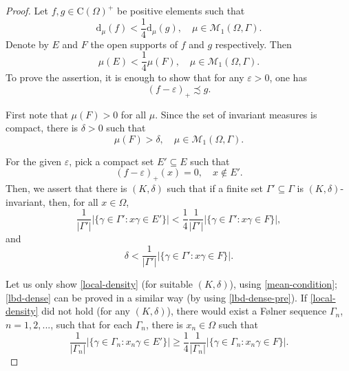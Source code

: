 \documentclass[12pt, oneside, psamsfonts]{amsart}
\theoremstyle{definition}
\theoremstyle{remark}
\numberwithin{equation}{section}
\newcommand{\abs}[1]{\left\vert#1\right\vert}
\newcommand{\eps}{\varepsilon}
\begin{document}
\begin{proof}
Let $f, g \in \mathrm{C}(\Omega)^+$ be positive elements such that $$\mathrm{d}_\mu(f) < \frac{1}{4} \mathrm{d}_\mu(g), \quad \mu \in \mathcal M_1(\Omega, \Gamma).$$
Denote by $E$ and $F$ the open supports of $f$ and $g$ respectively. Then 
\begin{equation}\label{mean-condition}
\mu(E) < \frac{1}{4} \mu(F), \quad  \mu \in \mathcal M_1(\Omega, \Gamma). 
\end{equation}
To prove the assertion, it is enough to show that for any $\eps>0$, one has
$$(f - \eps)_+ \precsim g.$$ %

First note that $\mu(F) > 0$ for all $\mu$. Since the set of invariant measures is compact, there is $\delta>0$ such that 
\begin{equation}\label{lbd-dense-pre}
\mu(F)>\delta,\quad  \mu \in \mathcal M_1(\Omega, \Gamma). 
\end{equation}

For the given $\eps$, pick a compact set $E' \subseteq E$ such that 
$$(f - \eps)_+(x) = 0 ,\quad x \notin E'. $$ Then, we assert that there is $(K, \delta)$ such that if a finite set $\Gamma' \subseteq \Gamma$ is $(K, \delta)$-invariant, then, for all $x \in \Omega$, 
\begin{equation}\label{local-density}
\frac{1}{\abs{\Gamma'}}\abs{\{\gamma \in \Gamma': x \gamma \in E'\}} < \frac{1}{4}  \frac{1}{\abs{\Gamma'}}\abs{\{\gamma \in \Gamma': x \gamma \in F\}},
\end{equation}
and
\begin{equation}\label{lbd-dense}
\delta <  \frac{1}{\abs{\Gamma'}}\abs{\{\gamma \in \Gamma': x\gamma \in F\}}.
\end{equation}

Let us only show \eqref{local-density} (for suitable $(K, \delta)$), using \eqref{mean-condition};  \eqref{lbd-dense} can be proved in a similar way (by using \eqref{lbd-dense-pre}). 
If \eqref{local-density} did not hold (for any $(K, \delta)$), there would exist a F{\o}lner sequence $\Gamma_n$, $n=1, 2, ...$, such that for each $\Gamma_n$, there is $x_n \in \Omega$ such that 
\begin{equation}\label{eq-02-003}
\frac{1}{\abs{\Gamma_n}}\abs{\{\gamma \in \Gamma_n: x_n\gamma \in E'\}} \geq \frac{1}{4}  \frac{1}{\abs{\Gamma_n}}\abs{\{\gamma \in \Gamma_n: x_n\gamma \in F\}}.
\end{equation}


\end{proof}
\end{document}
